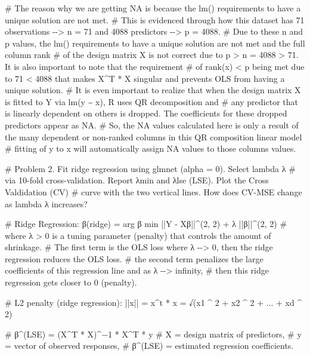 \documentclass[
  letterpaper,
  DIV=11,
  numbers=noendperiod]{scrreprt}
\newenvironment{Shaded}{\begin{snugshade}}{\end{snugshade}}
\newcommand{\CommentTok}[1]{\textcolor[rgb]{0.37,0.37,0.37}{#1}}
\begin{document}
{\begin{Shaded}
\begin{Highlighting}[]
\CommentTok{\# The reason why we are getting NA is because the lm() requirements to have a unique solution are not met.}
\CommentTok{\# This is evidenced through how this dataset has 71 observations  {-}{-}\textgreater{} n = 71 and 4088 predictors {-}{-}\textgreater{} p = 4088.}
\CommentTok{\# Due to these n and p values, the lm() requirements to have a unique solution are not met and the full column rank}
\CommentTok{\# of the design matrix X is not correct due to p \textgreater{} n = 4088 \textgreater{} 71. It is also important to note that the requirement}
\CommentTok{\# of rank(x) \textless{} p being met due to 71 \textless{} 4088 that makes X\^{}T * X singular and prevents OLS from having a unique solution.}
\CommentTok{\# It is even important to realize that when the design matrix X is fitted to Y via lm(y \textasciitilde{} x), R uses QR decomposition and}
\CommentTok{\# any predictor that is linearly dependent on others is dropped. The coefficients for these dropped predictors appear as NA.}
\CommentTok{\# So, the NA values calculated here is only a result of the many dependent or non{-}ranked columns in this QR composition linear model}
\CommentTok{\# fitting of y to x will automatically assign NA values to those columns values.}


\CommentTok{\# Problem 2. Fit ridge regression using glmnet (alpha = 0). Select lambda λ}
\CommentTok{\# via 10{-}fold cross{-}validation. Report λmin and λlse (LSE). Plot the Cross Valdidation (CV)}
\CommentTok{\# curve with the two vertical lines. How does CV{-}MSE change as lambda λ increases?}

\CommentTok{\# Ridge Regression: β(ridge) = arg β min ||Y {-} Xβ||\^{}(2, 2) + λ ||β||\^{}(2, 2)}
\CommentTok{\# where λ \textgreater{} 0 is a tuning parameter (penalty) that controls the amount of shrinkage.}
\CommentTok{\# The first term is the OLS loss where λ {-}{-}\textgreater{} 0, then the ridge regression reduces the OLS loss.}
\CommentTok{\# the second term penalizes the large coefficients of this regression line and as λ {-}{-}\textgreater{} infinity,}
\CommentTok{\# then this ridge regression gets closer to 0 (penalty).}

\CommentTok{\# L2 penalty (ridge regression): ||x|| = x\^{}t * x = √(x1 \^{} 2 + x2 \^{} 2 + ... + xd \^{} 2)}

\CommentTok{\# β\^{}(LSE) ​= (X\^{}T * X)\^{}−1 * X\^{}T * y}
\CommentTok{\# X = design matrix of predictors,}
\CommentTok{\# y = vector of observed responses,}
\CommentTok{\# β\^{}(LSE) = estimated regression coefficients.}


\end{Highlighting}
\end{Shaded}}
\end{document}
